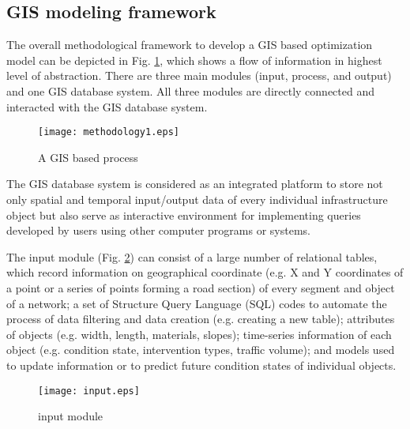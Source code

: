 \documentclass[a4paper,3p,times,authoryear]{elsarticle}
\begin{document}
\subsection{GIS modeling framework}
The overall methodological framework to develop a GIS based optimization model can be depicted in Fig. \ref{methodology1}, which shows a flow of information in highest level of abstraction. There are three main modules (input, process, and output) and one GIS database system. All three modules are directly connected and interacted with the GIS database system.
%
\begin{figure}[H]
\begin{center}
\texttt{[image: methodology1.eps]}
\caption{A GIS based process}\label{methodology1}
\end{center}
\end{figure}
The GIS database system is considered as an integrated platform to store not only spatial and temporal input/output data of every individual infrastructure object but also serve as interactive environment for implementing queries developed by users using other computer programs or systems. 

The input module (Fig. \ref{input}) can consist of a large number of relational tables, which record information on geographical coordinate (e.g. X and Y coordinates of a point or a series of points forming a road section) of every segment and object of a network; a set of Structure Query Language (SQL) codes to automate the process of data filtering and data creation (e.g. creating a new table); attributes of objects (e.g. width, length, materials, slopes); time-series information of each object (e.g. condition state, intervention types, traffic volume); and models used to update information or to predict future condition states of individual objects. 

\begin{figure}[H]
\begin{center}
\texttt{[image: input.eps]}
\caption{input module}\label{input}
\end{center}
\end{figure}
\end{document}
